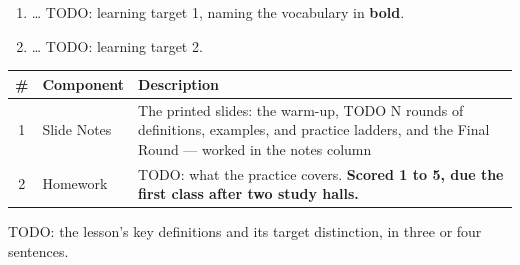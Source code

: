 \documentclass[12pt]{article}
\begin{document}

\namedateperiod
\vspace{0.18in}

\boxguard[14]
\begin{learningtargetbox}
\small
\begin{enumerate}[leftmargin=1.5em, itemsep=5pt]
  \item \ldots{} TODO: learning target 1, naming the vocabulary in \textbf{bold}.
  \item \ldots{} TODO: learning target 2.
\end{enumerate}
\end{learningtargetbox}

\vspace{0.14in}

\boxguard[14]
\begin{tocbox}
\small
\renewcommand{\arraystretch}{1.5}
\begin{tabularx}{\linewidth}{@{} c l X @{}}
\rowcolor{forestbg}
\textbf{\#} & \textbf{Component} & \textbf{Description} \\
\midrule
1 & Slide Notes & The printed slides: the warm-up, TODO N rounds of definitions, examples, and
                  practice ladders, and the Final Round --- worked in the notes column \\
2 & Homework    & TODO: what the practice covers. \textbf{Scored 1 to 5, due the first class after two study halls.} \\
\end{tabularx}
\end{tocbox}

\vspace{0.14in}

\boxguard[8]
\begin{remindbox}
\small TODO: the lesson's key definitions and its target distinction, in three or four sentences.
\end{remindbox}
\end{document}
